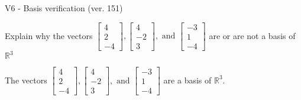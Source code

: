 \begin{exercise}
  \begin{exerciseTitle}V6 - Basis verification (ver. 151)\end{exerciseTitle}
  \begin{exerciseStatement}
    Explain why the vectors \(\left[\begin{array}{r}
4 \\
2 \\
-4
\end{array}\right] , \left[\begin{array}{r}
4 \\
-2 \\
3
\end{array}\right] , \text{ and } \left[\begin{array}{r}
-3 \\
1 \\
-4
\end{array}\right]\) are or are not a basis of \(\mathbb{R}^3\)	


  \end{exerciseStatement}
  \begin{exerciseAnswer}
   The vectors \(\left[\begin{array}{r}
4 \\
2 \\
-4
\end{array}\right] , \left[\begin{array}{r}
4 \\
-2 \\
3
\end{array}\right] , \text{ and } \left[\begin{array}{r}
-3 \\
1 \\
-4
\end{array}\right]\) 
  	 are  a basis of \(\mathbb{R}^3\).
  


  \end{exerciseAnswer}
\end{exercise}